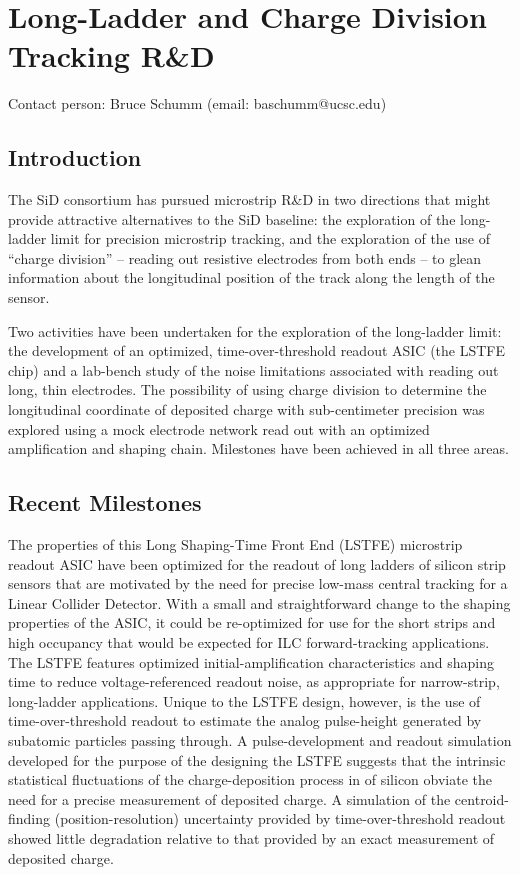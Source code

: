 
\section{Long-Ladder and Charge Division Tracking R\&D}
Contact person: Bruce Schumm (email: baschumm@ucsc.edu)
\subsection{Introduction}

The SiD consortium has pursued microstrip R\&D in two directions that might provide attractive
alternatives to the SiD baseline: the exploration of the long-ladder limit for precision
microstrip tracking, and the exploration of the use of ``charge division'' -- reading out
resistive electrodes from both ends --
to glean information about the longitudinal position of the track
along the length of the sensor.

Two activities have been undertaken for the exploration of the long-ladder limit:
the development of an optimized, time-over-threshold readout ASIC (the LSTFE chip)
and a lab-bench study of the noise limitations associated with reading out long,
thin electrodes.
The possibility of using charge division to determine the longitudinal
coordinate of deposited charge with sub-centimeter precision was explored
using a mock electrode network read out with an optimized amplification and
shaping chain. Milestones have been achieved in all three areas.

\subsection{Recent Milestones}

The properties of this Long Shaping-Time Front End (LSTFE) microstrip readout ASIC have
been optimized for the readout of long ladders of silicon strip sensors that are motivated
by the need for precise low-mass central tracking for a Linear Collider Detector. With a
small and straightforward change to the shaping properties of the ASIC, it could be re-optimized
for use for the short strips and high occupancy that would be expected for ILC forward-tracking applications.
The LSTFE features optimized initial-amplification characteristics
and shaping time to reduce voltage-referenced readout noise, as appropriate for narrow-strip, long-ladder
applications. Unique to the LSTFE design, however, is the use of time-over-threshold readout to estimate the
analog pulse-height generated by subatomic particles passing through. A pulse-development and readout simulation developed
for the purpose of the designing the LSTFE suggests that the intrinsic statistical fluctuations of the
charge-deposition process in \unit[300]{\micron} of silicon obviate the need for a precise measurement
of deposited charge. A simulation of the centroid-finding (position-resolution) uncertainty provided by
time-over-threshold readout showed little degradation relative to that provided by an exact measurement of
deposited charge.

